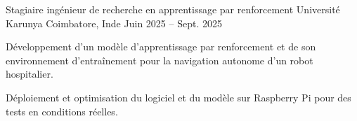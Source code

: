 \begin{cventries}
  \cventry
    {Stagiaire ingénieur de recherche en apprentissage par renforcement}
    {Université Karunya}
    {Coimbatore, Inde}
    {Juin 2025 -- Sept. 2025}
    {
      \begin{cvitems}
        \item {Développement d’un modèle d’apprentissage par renforcement et de son environnement d’entraînement pour la navigation autonome d’un robot hospitalier.}
        \item {Déploiement et optimisation du logiciel et du modèle sur Raspberry Pi pour des tests en conditions réelles.}
      \end{cvitems}
    }
\end{cventries}

